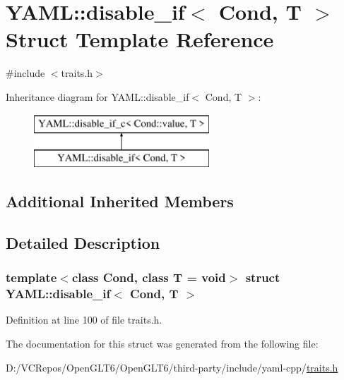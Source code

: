 \hypertarget{struct_y_a_m_l_1_1disable__if}{}\section{Y\+A\+ML\+::disable\+\_\+if$<$ Cond, T $>$ Struct Template Reference}
\label{struct_y_a_m_l_1_1disable__if}


{\ttfamily \#include $<$traits.\+h$>$}

Inheritance diagram for Y\+A\+ML\+::disable\+\_\+if$<$ Cond, T $>$\+:\begin{figure}[H]
\begin{center}
\leavevmode
\includegraphics[height=2.000000cm]{struct_y_a_m_l_1_1disable__if}
\end{center}
\end{figure}
\subsection*{Additional Inherited Members}


\subsection{Detailed Description}
\subsubsection*{template$<$class Cond, class T = void$>$\newline
struct Y\+A\+M\+L\+::disable\+\_\+if$<$ Cond, T $>$}



Definition at line 100 of file traits.\+h.



The documentation for this struct was generated from the following file\+:\begin{DoxyCompactItemize}
\item 
D\+:/\+V\+C\+Repos/\+Open\+G\+L\+T6/\+Open\+G\+L\+T6/third-\/party/include/yaml-\/cpp/\mbox{\hyperlink{traits_8h}{traits.\+h}}\end{DoxyCompactItemize}
